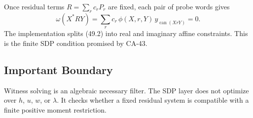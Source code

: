 Once residual terms \(R=\sum_rc_rP_r\) are fixed, each pair of probe words gives
\[
  \omega(X^*RY)
  =
  \sum_r c_r\,\phi(X,r,Y)\,
  y_{\operatorname{can}(XrY)}
  =
  0.
  \tag{49.2}
\]
The implementation splits (49.2) into real and imaginary affine constraints.
This is the finite SDP condition promised by CA-43.

\subsection{Important Boundary}

Witness solving is an algebraic necessary filter.  The SDP layer does not
optimize over \(h\), \(u\), \(w\), or \(\lambda\).  It checks whether a fixed
residual system is compatible with a finite positive moment restriction.
